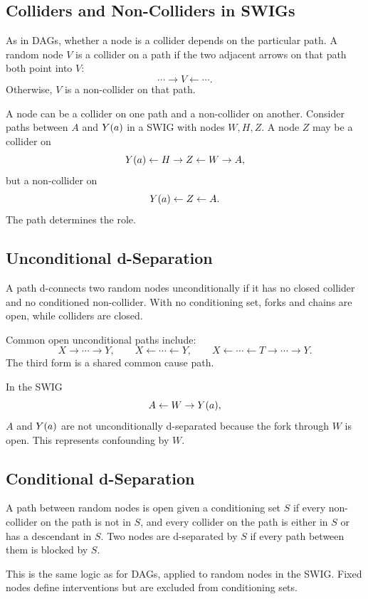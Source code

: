 \subsection{Colliders and Non-Colliders in SWIGs}

As in DAGs, whether a node is a collider depends on the particular path. A random node $V$ is a collider on a path if the two adjacent arrows on that path both point into $V$:
\[
\cdots \to V \leftarrow \cdots.
\]
Otherwise, $V$ is a non-collider on that path.

A node can be a collider on one path and a non-collider on another. Consider paths between $A$ and $Y(a)$ in a SWIG with nodes $W,H,Z$. A node $Z$ may be a collider on
\[
Y(a)\leftarrow H\to Z\leftarrow W\to A,
\]
but a non-collider on
\[
Y(a)\leftarrow Z\leftarrow A.
\]
The path determines the role.

\subsection{Unconditional d-Separation}

A path d-connects two random nodes unconditionally if it has no closed collider and no conditioned non-collider. With no conditioning set, forks and chains are open, while colliders are closed.

Common open unconditional paths include:
\[
X\to \cdots \to Y,
\qquad
X\leftarrow \cdots \leftarrow Y,
\qquad
X\leftarrow \cdots \leftarrow T\to \cdots \to Y.
\]
The third form is a shared common cause path.

In the SWIG
\[
A\leftarrow W\to Y(a),
\]
$A$ and $Y(a)$ are not unconditionally d-separated because the fork through $W$ is open. This represents confounding by $W$.

\subsection{Conditional d-Separation}

\begin{definition}
A path between random nodes is open given a conditioning set $S$ if every non-collider on the path is not in $S$, and every collider on the path is either in $S$ or has a descendant in $S$. Two nodes are d-separated by $S$ if every path between them is blocked by $S$.
\end{definition}

This is the same logic as for DAGs, applied to random nodes in the SWIG. Fixed nodes define interventions but are excluded from conditioning sets.

